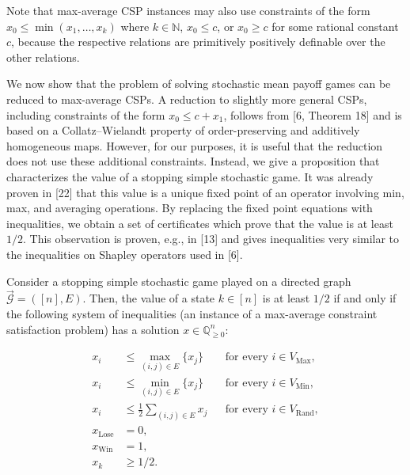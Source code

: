 Note that max-average CSP instances may also use constraints of the form $x_{0}\leq\min(x_{1},\dots,x_{k})$ where $k\in\mathbb{N}$, $x_{0}\leq c$, or $x_{0}\geq c$ for some rational constant $c$, because the respective relations are primitively positively definable over the other relations.

We now show that the problem of solving stochastic mean payoff games can be reduced to max-average CSPs. A reduction to slightly more general CSPs, including constraints of the form $x_{0}\leq c+x_{1}$, follows from [6, Theorem 18] and is based on a Collatz–Wielandt property of order-preserving and additively homogeneous maps. However, for our purposes, it is useful that the reduction does not use these additional constraints. Instead, we give a proposition that characterizes the value of a stopping simple stochastic game. It was already proven in [22] that this value is a unique fixed point of an operator involving min, max, and averaging operations. By replacing the fixed point equations with inequalities, we obtain a set of certificates which prove that the value is at least $1/2$. This observation is proven, e.g., in [13] and gives inequalities very similar to the inequalities on Shapley operators used in [6].

\setcounter{theorem}{4}
\begin{proposition}\label{Thmtheorem5}
Consider a stopping simple stochastic game played on a directed graph $\vec{\mathcal{G}}=([n],E)$. Then, the value of a state $k\in[n]$ is at least $1/2$ if and only if the following system of inequalities (an instance of a max-average constraint satisfaction problem) has a solution $x\in\mathbb{Q}_{\geq 0}^{n}$:


\begin{equation}\tag{1}\label{S3.E1}
\begin{aligned}
\displaystyle x_{i} & \displaystyle\leq\max_{(i,j)\in E}\{x_{j}\} &  & \displaystyle\text{for every }i\in V_{\mathrm{Max}}, \\
\displaystyle x_{i} & \displaystyle\leq\min_{(i,j)\in E}\{x_{j}\} &  & \displaystyle\text{for every }i\in V_{\mathrm{Min}}, \\
\displaystyle x_{i} & \displaystyle\leq\frac{1}{2}\sum_{(i,j)\in E}x_{j} &  & \displaystyle\text{for every }i\in V_{\mathrm{Rand}}, \\
\displaystyle x_{\mathrm{Lose}} & \displaystyle=0, \\
\displaystyle x_{\mathrm{Win}} & \displaystyle=1, \\
\displaystyle x_{k} & \displaystyle\geq 1/2.
\end{aligned}
\end{equation}
\end{proposition}

